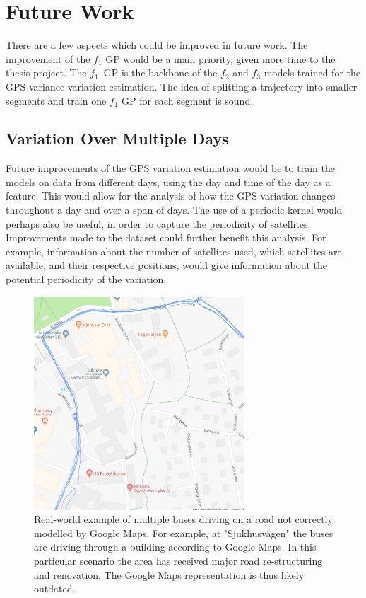 \section{Future Work}
There are a few aspects which could be improved in future work.
The improvement of the $f_1$ GP would be a main priority, given more time to the thesis project.
The $f_1$ GP is the backbone of the $f_2$ and $f_3$ models trained for the GPS variance variation estimation.
The idea of splitting a trajectory into smaller segments and train one $f_1$ GP for each segment is sound.

\subsection{Variation Over Multiple Days}
Future improvements of the GPS variation estimation would be to train the models on data from different days, using the day and time of the day as a feature.
This would allow for the analysis of how the GPS variation changes throughout a day and over a span of days.
The use of a periodic kernel would perhaps also be useful, in order to capture the periodicity of satellites.
Improvements made to the dataset could further benefit this analysis.
For example, information about the number of satellites used, which satellites are available, and their respective positions, would give information about the potential periodicity of the variation.

\begin{figure}[ht!]
    \centering
    \includegraphics[width=0.7\textwidth]{figures/gps_map_problem}
    \caption[Real-world example of multiple buses driving on a road not correctly modelled by Google Maps]
    {\small Real-world example of multiple buses driving on a road not correctly modelled by Google Maps.
    For example, at "Sjukhusvägen" the buses are driving through a building according to Google Maps.
    In this particular scenario the area has received major road re-structuring and renovation.
    The Google Maps representation is thus likely outdated.}
    \label{fig:gps-map-problem}
\end{figure}

